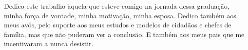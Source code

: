 
\begin{dedicatoria}

Dedico este trabalho àquela que esteve comigo na jornada dessa graduação, minha força de vontade, minha motivação, minha esposa. Dedico também aos meus avós, pelo suporte aos meus estudos e modelos de cidadãos e chefes de família, mas que não puderam ver a conclusão. E também aos meus pais que me incentivaram a nunca desistir.

\end{dedicatoria}
